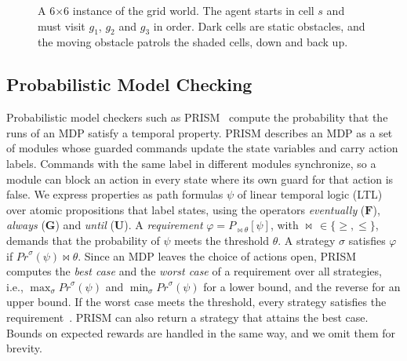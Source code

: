 \begin{figure}[t]
\centering
{}
\caption{A 6$\times$6 instance of the grid world. The agent starts in cell $s$ and must visit $g_1$, $g_2$ and $g_3$ in order. Dark cells are static obstacles, and the moving obstacle patrols the shaded cells, down and back up.}
\label{fig:grid}
\end{figure}

\subsection{Probabilistic Model Checking}
\label{sec:bg-pmc}

Probabilistic model checkers such as PRISM~\cite{TODO-PRISM} compute the probability that the runs of an MDP satisfy a temporal property.
PRISM describes an MDP as a set of modules whose guarded commands update the state variables and carry action labels.
Commands with the same label in different modules synchronize, so a module can block an action in every state where its own guard for that action is false.
We express properties as path formulas $\psi$ of linear temporal logic (LTL)~\cite{TODO-Pnueli1977-LTL} over atomic propositions that label states, using the operators \textit{eventually} ($\mathbf{F}$), \textit{always} ($\mathbf{G}$) and \textit{until} ($\mathbf{U}$).
A \textit{requirement} $\varphi = P_{\bowtie \theta}[\psi]$, with $\bowtie\, \in \{\geq, \leq\}$, demands that the probability of $\psi$ meets the threshold $\theta$.
A strategy $\sigma$ satisfies $\varphi$ if $\mathit{Pr}^{\sigma}(\psi) \bowtie \theta$.
Since an MDP leaves the choice of actions open, PRISM computes the \textit{best case} and the \textit{worst case} of a requirement over all strategies, i.e., $\max_\sigma \mathit{Pr}^{\sigma}(\psi)$ and $\min_\sigma \mathit{Pr}^{\sigma}(\psi)$ for a lower bound, and the reverse for an upper bound.
If the worst case meets the threshold, every strategy satisfies the requirement~\cite{TODO-Baier2008-principles}.
PRISM can also return a strategy that attains the best case.
Bounds on expected rewards are handled in the same way, and we omit them for brevity.

